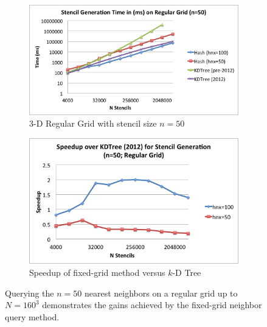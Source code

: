 \documentclass{report}
\begin{document}
\begin{figure}
\centering
\begin{subfigure}{11cm}
\centering
\includegraphics[width=\textwidth]{../figures/stencils/kdtree_old_reg_subsets_4m_stencil_gen_time.png}
\caption{3-D Regular Grid with stencil size $n=50$}
\label{fig:sten_query_a}
\end{subfigure}
\begin{subfigure}{9.5cm}
\centering
\includegraphics[width=\textwidth]{../figures/stencils/reg_subsets_4m_stencil_gen_speedup.png}
\caption{Speedup of fixed-grid method versus $k$-D Tree}
\end{subfigure}
\caption{Querying the $n=50$ nearest neighbors on a regular grid up to $N=160^3$ demonstrates the gains achieved by the fixed-grid neighbor query method.}
\label{fig:stencil_query_old_and_new}
\end{figure}
\end{document}
